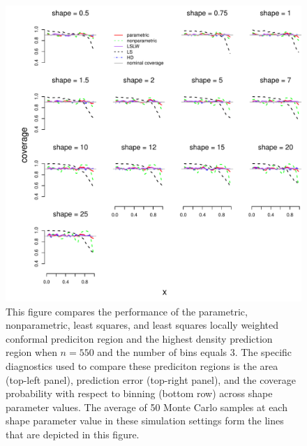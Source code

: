 \documentclass[11pt]{article}\usepackage[]{graphicx}\usepackage[]{color}
\makeatletter
\def\maxwidth{ %
  \ifdim\Gin@nat@width>\linewidth
    \linewidth
  \else
    \Gin@nat@width
  \fi
}
\newenvironment{knitrout}{}{} %
\makeatother
\begin{document}
\newpage
\begin{figure}[h!]
\begin{center}
\begin{knitrout}
\color{fgcolor}
\includegraphics[width=\maxwidth]{figure/Fig-gamma-inx-500-1} 

\end{knitrout}
\end{center}
\caption{This figure compares the performance of the 
  parametric,
  nonparametric,
  least squares, and 
  least squares locally weighted conformal prediciton region and the 
  highest density prediction region when $n = 550$ and the number of bins 
  equals 3.  
  The specific diagnostics used to compare these prediciton regions is the 
    area (top-left panel),
    prediction error (top-right panel), and
    the coverage probability with respect to binning (bottom row) 
    across shape parameter values.
  The average of 50 Monte Carlo samples at each shape parameter value in 
  these simulation settings form the lines that are depicted in this figure.}
\label{Fig:gamma.inx.500}
\end{figure}
\end{document}
